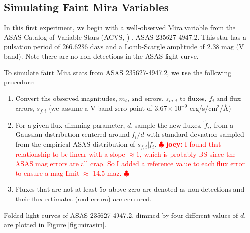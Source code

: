 \documentclass[12pt,preprint]{aastex}
\newcommand{\joey}[1] { \textcolor{red} {
\ensuremath{\clubsuit} {\bf joey:}  {#1}
\ensuremath{\clubsuit} } }%
\begin{document}
\subsection{Simulating Faint Mira Variables}
\label{ss:mirasim}

In this first experiment, we begin with a well-observed Mira variable from the ASAS Catalog of Variable Stars (ACVS, \citealt{acvs}) , ASAS 235627-4947.2.  This star has a pulsation period of 266.6286 days and a Lomb-Scargle amplitude of 2.38 mag (V band).  Note there are no non-detections in the ASAS light curve.

To simulate faint Mira stars from ASAS 235627-4947.2, we use the following procedure:
\begin{enumerate}
\item Convert the observed magnitudes, $m_i$, and errors, $s_{m,i}$ to fluxes, $f_i$ and flux errors, $s_{f,i}$ (we assume a V-band zero-point of $3.67\times10^{-9}$ erg/s/cm$^2$/\AA)
\item For a given flux dimming parameter, $d$, sample the new fluxes, $\tilde{f}_i$, from a Gaussian distribution centered around $f_i / d$ with standard deviation sampled from the empirical ASAS distribution of $s_{f,i} | f_i$. \joey{I found that relationship to be linear with a slope $\approx 1$, which is probably BS since the ASAS mag errors are all crap.  So I added a reference value to each flux error to ensure a mag limit $\approx$ 14.5 mag.}
\item Fluxes that are not at least 5$\sigma$ above zero are denoted as non-detections and their flux estimates (and errors) are censored.
\end{enumerate}
Folded light curves of ASAS 235627-4947.2, dimmed by four different values of $d$, are plotted in Figure \ref{fig:mirasim}.
\end{document}
